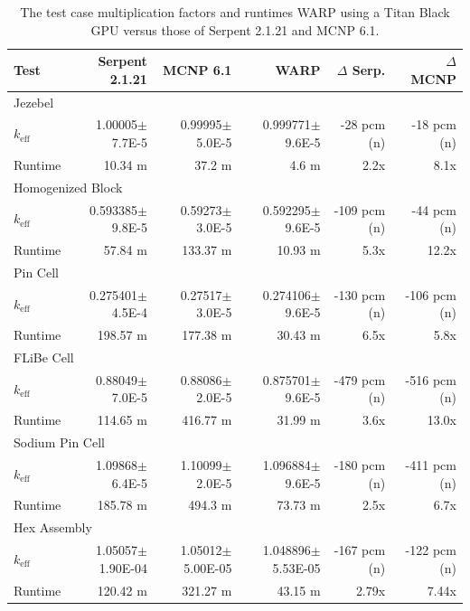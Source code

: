 \documentclass[preprint,12pt]{elsarticle}
\begin{document}
\begin{table}[h]
\centering
\caption{The test case multiplication factors and runtimes WARP using a Titan Black GPU versus those of Serpent 2.1.21 and MCNP 6.1.}
\label{results_table_titan}
\footnotesize
\begin{tabular}{| l | r | r | r || r | r |}
\hline
Test & Serpent 2.1.21 & MCNP 6.1 & WARP & $\Delta$ Serp. & $\Delta$ MCNP  \\
\hline
\hline
\multicolumn{6}{|l|}{Jezebel} \\
\hline
$k_\mathrm{eff}$ & 1.00005$\pm$7.7E-5 &	0.99995$\pm$5.0E-5 &	0.999771$\pm$9.6E-5 &	-28 pcm (n) &	 -18 pcm (n) \\
\hline
Runtime & 10.34 m  &	37.2  m &	4.6  m &	  2.2x      &	8.1x \\
\hline
\hline
\multicolumn{6}{|l|}{Homogenized Block }\\
\hline
$k_\mathrm{eff}$ & 0.593385$\pm$9.8E-5 &	0.59273$\pm$3.0E-5 &	0.592295$\pm$9.6E-5 &	-109  pcm (n)&	-44 pcm  (n)\\
\hline
Runtime & 57.84  m &	133.37 m  &	10.93 m  &	5.3x &	12.2x \\
\hline
\hline
\multicolumn{6}{|l|}{Pin Cell}\\
\hline
$k_\mathrm{eff}$ & 0.275401$\pm$4.5E-4 &	0.27517$\pm$3.0E-5 &	0.274106$\pm$9.6E-5 &	-130  pcm (n)&	-106  pcm (n)\\
\hline
Runtime & 198.57 m &	177.38 m &	30.43  m &	6.5x &	5.8x \\
\hline
\hline
\multicolumn{6}{|l|}{FLiBe Cell}\\
\hline
$k_\mathrm{eff}$ & 0.88049$\pm$7.0E-5 &	0.88086$\pm$2.0E-5 &	0.875701$\pm$9.6E-5 &	-479  pcm (n) &	-516 pcm  (n)\\
\hline
Runtime & 114.65 m  &	416.77 m  &	31.99 m  &	3.6x &	13.0x \\
\hline
\hline
\multicolumn{6}{|l|}{Sodium Pin Cell}\\
\hline
$k_\mathrm{eff}$ & 1.09868$\pm$6.4E-5 &	1.10099$\pm$2.0E-5 &	1.096884$\pm$9.6E-5 &	-180  pcm (n) &	-411 pcm (n) \\
\hline
Runtime & 185.78 m  &	494.3 m  &	73.73  m &	2.5x &	6.7x \\
\hline
\hline
\multicolumn{6}{|l|}{Hex Assembly}\\
\hline
$k_\mathrm{eff}$ & 1.05057$\pm$1.90E-04 &	1.05012$\pm$5.00E-05 &	1.048896$\pm$5.53E-05 &	-167 pcm (n) &	-122 pcm (n)  \\
\hline
Runtime & 120.42 m  &	321.27 m  &	43.15  m &	2.79x &	7.44x \\
\hline
\end{tabular}
\end{table}
\end{document}
